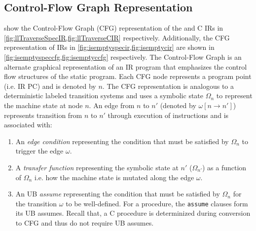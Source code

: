 \subsection{Control-Flow Graph Representation}
\label{sec:cfg}
 show the Control-Flow Graph (CFG) representation
of the \SpecL{} and C IRs in \cref{fig:llTraverseSpecIR,fig:llTraverseCIR} respectively.
Additionally, the CFG representation of IRs in \cref{fig:isemptyspecir,fig:isemptycir} are
shown in \cref{fig:isemptyspeccfg,fig:isemptyccfg} respectively.
The Control-Flow Graph is an alternate graphical representation of an IR program that emphasizes
the control flow structures of the static program.
Each CFG node represents a program point (i.e. IR PC) and is denoted by $n$.
The CFG representation is analogous to a deterministic labeled transition systems and
uses a symbolic state $\Omega_n$ to represent the machine state at node $n$.
An edge from $n$ to $n'$ (denoted by $\omega[n \rightarrow n']$) represents transition
from $n$ to $n'$ through execution of instructions and is associated with:
\begin{enumerate}
\item An {\em edge condition} representing the condition that must be satisfied by $\Omega_n$
to trigger the edge $\omega$.
\item A {\em transfer function} representing the symbolic state at $n'$ ($\Omega_{n'}$) as a function of $\Omega_n$
i.e. how the machine state is mutated along the edge $\omega$.
\item An UB {\em assume} representing the condition that must be satisfied by $\Omega_n$ for
the transition $\omega$ to be well-defined.
For a \SpecL{} procedure, the {\tt assume} clauses form its UB assumes.
Recall that, a C procedure is determinized during conversion to CFG and thus do not require UB assumes.
\end{enumerate}

